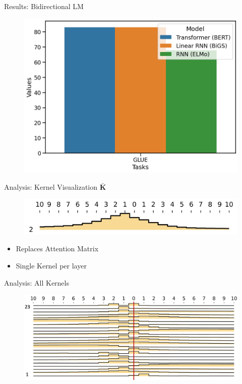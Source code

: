 \begin{frame}{Results: Bidirectional LM \cite{Wang2022-un}}
\begin{figure}
    \centering
    \includegraphics[height=0.6\textheight]{Figs/BiGS.png}
\end{figure}
\end{frame}


\begin{frame}{Analysis: Kernel Visualization $\boldsymbol{\bar{K}}$}

\begin{figure}
    \centering
    \includegraphics[width=\textwidth]{Figs/kernel1.png}
\end{figure}

\begin{itemize}
    \item Replaces Attention Matrix
    \item Single Kernel per layer 
\end{itemize}
\end{frame}

\begin{frame}{Analysis: All Kernels}
\begin{figure}
    \centering
    \includegraphics[height=0.6\textheight]{Figs/kernel2.png}
\end{figure}
\end{frame}

